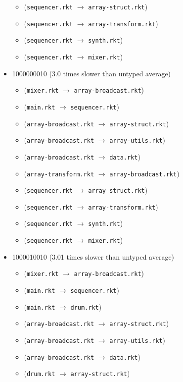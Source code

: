 \documentclass{article}
\newcommand{\mono}[1]{\texttt{#1}}
\begin{document}
\begin{itemize}
\begin{itemize}
  \item (\mono{sequencer.rkt} $\rightarrow$ \mono{array-struct.rkt})
  \item (\mono{sequencer.rkt} $\rightarrow$ \mono{array-transform.rkt})
  \item (\mono{sequencer.rkt} $\rightarrow$ \mono{synth.rkt})
  \item (\mono{sequencer.rkt} $\rightarrow$ \mono{mixer.rkt})
  \end{itemize}
\item 1000000010 (3.0 times slower than untyped average)
  \begin{itemize}
  \item (\mono{mixer.rkt} $\rightarrow$ \mono{array-broadcast.rkt})
  \item (\mono{main.rkt} $\rightarrow$ \mono{sequencer.rkt})
  \item (\mono{array-broadcast.rkt} $\rightarrow$ \mono{array-struct.rkt})
  \item (\mono{array-broadcast.rkt} $\rightarrow$ \mono{array-utils.rkt})
  \item (\mono{array-broadcast.rkt} $\rightarrow$ \mono{data.rkt})
  \item (\mono{array-transform.rkt} $\rightarrow$ \mono{array-broadcast.rkt})
  \item (\mono{sequencer.rkt} $\rightarrow$ \mono{array-struct.rkt})
  \item (\mono{sequencer.rkt} $\rightarrow$ \mono{array-transform.rkt})
  \item (\mono{sequencer.rkt} $\rightarrow$ \mono{synth.rkt})
  \item (\mono{sequencer.rkt} $\rightarrow$ \mono{mixer.rkt})
  \end{itemize}
\item 1000010010 (3.01 times slower than untyped average)
  \begin{itemize}
  \item (\mono{mixer.rkt} $\rightarrow$ \mono{array-broadcast.rkt})
  \item (\mono{main.rkt} $\rightarrow$ \mono{sequencer.rkt})
  \item (\mono{main.rkt} $\rightarrow$ \mono{drum.rkt})
  \item (\mono{array-broadcast.rkt} $\rightarrow$ \mono{array-struct.rkt})
  \item (\mono{array-broadcast.rkt} $\rightarrow$ \mono{array-utils.rkt})
  \item (\mono{array-broadcast.rkt} $\rightarrow$ \mono{data.rkt})
  \item (\mono{drum.rkt} $\rightarrow$ \mono{array-struct.rkt})

\end{itemize}
\end{itemize}
\end{document}
